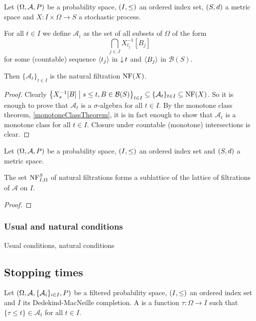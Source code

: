 \begin{lemma}
Let $\left( \Omega, \mathcal{A}, P \right)$ be a probability space, $\left( I,\leq \right)$ an ordered index set, $\left( S,d \right)$ a metric space and $X: I\times\Omega\to S$ a stochastic process.

For all $t\in I$ we define $\mathcal{A}_i$ as the set of all subsets of $\Omega$ of the form
\[ \bigcap_{j\in J} X_{t_j}^{-1}[B_j] \]
for some (countable) sequence $\left\langle t_j \right\rangle$ in $\operatorname{\downarrow} t$ and $\left\langle B_j \right\rangle$ in $\mathcal{B}(S)$.

Then $\{\mathcal{A}_t\}_{t\in I}$ is the natural filtration $\operatorname{NF}(X)$.
\end{lemma}
\begin{proof}
Clearly $\left\{ X_s^{-1}[B] \;\middle|\; s\leq t, B\in \mathcal{B}(S) \right\}_{t\in I} \subseteq \{\mathcal{A}_t\}_{t\in I} \subseteq \operatorname{NF}(X)$. So it is enough to prove that $\mathcal{A}_t$ is a $\sigma$-algebra for all $t\in I$. By the monotone class theorem, \ref{monotoneClassTheorem}, it is in fact enough to show that $\mathcal{A}_t$ is a monotone class for all $t\in I$. Closure under countable (monotone) intersections is clear.


\end{proof}

\begin{proposition}
Let $\left( \Omega, \mathcal{A}, P \right)$ be a probability space, $\left( I,\leq \right)$ an ordered index set and $\left( S,d \right)$ a metric space.

The set $\operatorname{NF}_{I,\Omega}^S$ of natural filtrations forms a sublattice of the lattice of filtrations of $\mathcal{A}$ on $I$.
\end{proposition}
\begin{proof}

\end{proof}

\subsubsection{Usual and natural conditions}
\begin{definition}
Usual conditions, natural conditions
\end{definition}

\subsection{Stopping times}
\begin{definition}
Let $\left( \Omega, \mathcal{A}, \{\mathcal{A}_i\}_{i\in I}, P \right)$ be a filtered probability space, $\left( I,\leq \right)$ an ordered index set and $\overline{I}$ its Dedekind-MacNeille completion. A  is a function $\tau: \Omega \to I$ such that $\{\tau \leq t\} \in \mathcal{A}_t$ for all $t\in I$.
\end{definition}


